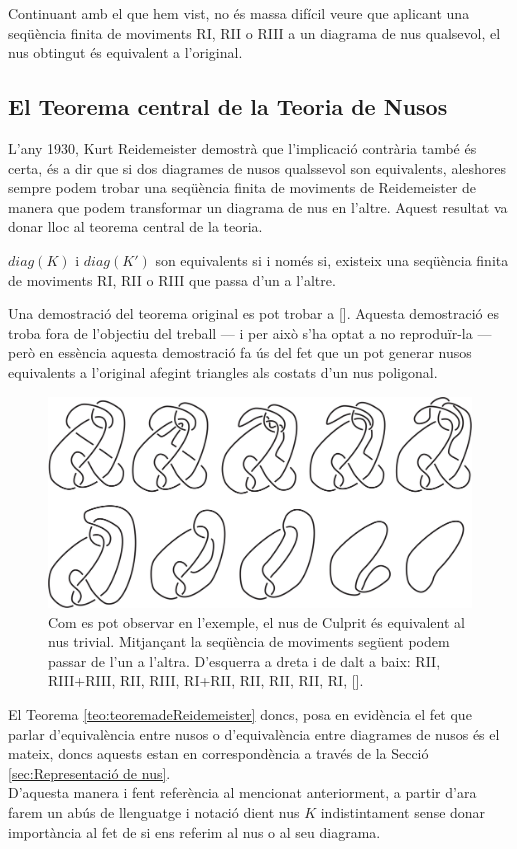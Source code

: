 Continuant amb el que hem vist, no és massa difícil veure que aplicant una seqüència finita de moviments RI, RII o RIII a un diagrama de nus qualsevol, el nus obtingut és equivalent a l'original.

\subsection{El Teorema central de la Teoria de Nusos}\label{sec:teoremacentraldelateoria}

L'any 1930, Kurt Reidemeister demostrà que l'implicació contrària també és certa, és a dir que si dos diagrames de nusos qualssevol son equivalents, aleshores sempre podem trobar una seqüència finita de moviments de Reidemeister de manera que podem transformar un diagrama de nus en l'altre. Aquest resultat va donar lloc al teorema central de la teoria.

\begin{theorem}\label{teo:teoremadeReidemeister}
   $diag(K)$ i $diag(K')$ son equivalents si i només si, existeix una seqüència finita de moviments RI, RII o RIII que passa d'un a l'altre.
\end{theorem}

Una demostració del teorema original es pot trobar a [\cite{knotknotes}]. Aquesta demostració es troba fora de l'objectiu del treball --- i per això s'ha optat a no reproduïr-la --- però en essència aquesta demostració fa ús del fet que un pot generar nusos equivalents a l'original afegint triangles als costats d'un nus poligonal.\\

\begin{figure}
	\centering
	\includegraphics[width=0.9\linewidth]{img/culprit-knot.png}
	\caption{Com es pot observar en l'exemple, el nus de Culprit és equivalent al nus trivial. Mitjançant la seqüència de moviments següent podem passar de l'un a l'altra. D'esquerra a dreta i de dalt a baix: RII, RIII+RIII, RII, RIII, RI+RII, RII, RII, RII, RI, [\cite{culpritknot}].}\label{fig:culpritknot}
\end{figure}

El Teorema \ref{teo:teoremadeReidemeister} doncs, posa en evidència el fet que parlar d'equivalència entre nusos o d'equivalència entre diagrames de nusos és el mateix, doncs aquests estan en correspondència a través de la Secció \ref{sec:Representació de nus}.\\

D'aquesta manera i fent referència al mencionat anteriorment, a partir d'ara farem un abús de llenguatge i notació dient nus $K$ indistintament sense donar importància al fet de si ens referim al nus o al seu diagrama.